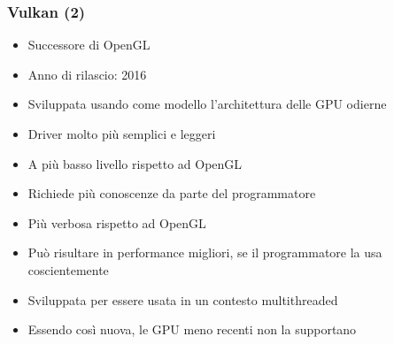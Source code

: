 \begin{frame}
\frametitle{Vulkan (2)}

\begin{itemize}
\item Successore di OpenGL
\item Anno di rilascio: 2016
\item Sviluppata usando come modello l'architettura delle GPU odierne
\item Driver molto più semplici e leggeri
\item A più basso livello rispetto ad OpenGL
\item Richiede più conoscenze da parte del programmatore
\item Più verbosa rispetto ad OpenGL
\item Può risultare in performance migliori, se il programmatore la usa coscientemente
\item Sviluppata per essere usata in un contesto multithreaded
\item Essendo così nuova, le GPU meno recenti non la supportano
\end{itemize}

\end{frame}
